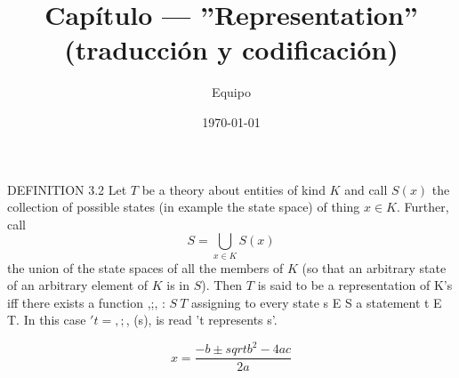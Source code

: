 \title{Capítulo — ''Representation'' (traducción y codificación)}
\author{Equipo}
\date{\today}
\maketitle

\noindent DEFINITION 3.2 Let $T$ be a theory about entities of kind $K$ and call $S(x)$
the collection of possible states (in example the state space) of thing $x \in K$. Further,
call 
\[
S=\bigcup\limits_{x\in K}S(x)
\]
the union of the state spaces of all the members of $K$
(so that an arbitrary state of an arbitrary element of $K$ is in $S$). Then $T$
is said to be a representation of K's iff there exists a function ,;, : $S ~ T$
assigning to every state s E S a statement t E T. In this case $'t = ,;$, (s), is
read 't represents s'.

\[
x = \frac{-b \pm sqrt{b^2 - 4ac}}{2a}
\]
